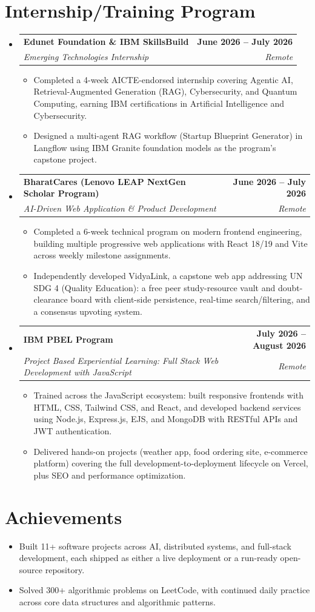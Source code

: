 \documentclass[letterpaper,10pt]{article}
\makeatletter
\newcommand{\resumeItem}[1]{
  \item\small{
    {#1 \vspace{-2pt}}
  }
}
\newcommand{\resumeSubheading}[4]{
  \vspace{-2pt}\item
    \begin{tabular*}{1.0\textwidth}[t]{l@{\extracolsep{\fill}}r}
      \textbf{#1} & \textbf{\small #2} \\
      \textit{\small#3} & \textit{\small #4} \\
    \end{tabular*}\vspace{-7pt}
}
\newcommand{\resumeSubHeadingListStart}{\begin{itemize}[leftmargin=0.0in, label={}]}
\newcommand{\resumeSubHeadingListEnd}{\end{itemize}}
\newcommand{\resumeItemListStart}{\begin{itemize}}
\newcommand{\resumeItemListEnd}{\end{itemize}\vspace{-5pt}}
\makeatother
\begin{document}
\section{Internship/Training Program}
  \resumeSubHeadingListStart
    \resumeSubheading
      {Edunet Foundation \& IBM SkillsBuild}{June 2026 -- July 2026}
      {Emerging Technologies Internship}{Remote}
      \resumeItemListStart
        \resumeItem{Completed a 4-week AICTE-endorsed internship covering Agentic AI, Retrieval-Augmented Generation (RAG), Cybersecurity, and Quantum Computing, earning IBM certifications in Artificial Intelligence and Cybersecurity.}
        \resumeItem{Designed a multi-agent RAG workflow (Startup Blueprint Generator) in Langflow using IBM Granite foundation models as the program's capstone project.}
      \resumeItemListEnd
    \resumeSubheading
      {BharatCares (Lenovo LEAP NextGen Scholar Program)}{June 2026 -- July 2026}
      {AI-Driven Web Application \& Product Development}{Remote}
      \resumeItemListStart
        \resumeItem{Completed a 6-week technical program on modern frontend engineering, building multiple progressive web applications with React 18/19 and Vite across weekly milestone assignments.}
        \resumeItem{Independently developed VidyaLink, a capstone web app addressing UN SDG 4 (Quality Education): a free peer study-resource vault and doubt-clearance board with client-side persistence, real-time search/filtering, and a consensus upvoting system.}
      \resumeItemListEnd
    \resumeSubheading
      {IBM PBEL Program}{July 2026 -- August 2026}
      {Project Based Experiential Learning: Full Stack Web Development with JavaScript}{Remote}
      \resumeItemListStart
        \resumeItem{Trained across the JavaScript ecosystem: built responsive frontends with HTML, CSS, Tailwind CSS, and React, and developed backend services using Node.js, Express.js, EJS, and MongoDB with RESTful APIs and JWT authentication.}
        \resumeItem{Delivered hands-on projects (weather app, food ordering site, e-commerce platform) covering the full development-to-deployment lifecycle on Vercel, plus SEO and performance optimization.}
      \resumeItemListEnd
  \resumeSubHeadingListEnd
\vspace{-12pt}

\section{Achievements}
      \resumeItemListStart
\resumeItem{Built 11+ software projects across AI, distributed systems, and full-stack development, each shipped as either a live deployment or a run-ready open-source repository.}
  \vspace{-16pt}
\resumeItem{Solved 300+ algorithmic problems on LeetCode, with continued daily practice across core data structures and algorithmic patterns.}
     \resumeItemListEnd
\end{document}
